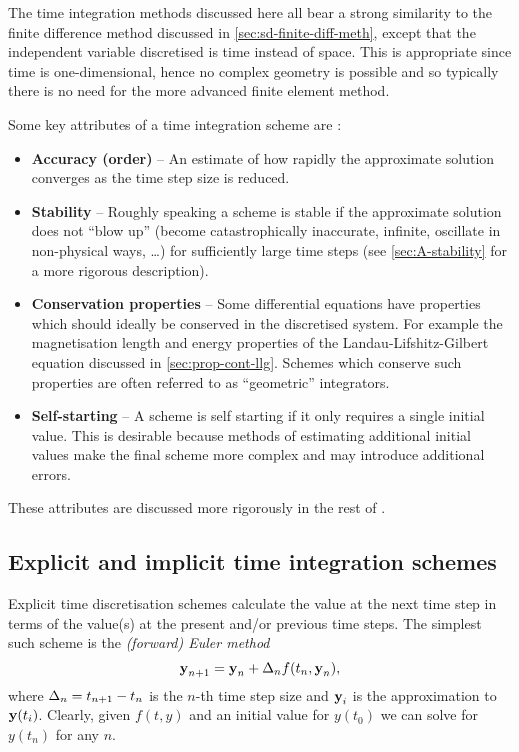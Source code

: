 The time integration methods discussed here all bear a strong similarity to the finite difference method discussed in \cref{sec:sd-finite-diff-meth}, except that the independent variable discretised is time instead of space.
This is appropriate since time is one-dimensional, hence no complex geometry is possible and so typically there is no need for the more advanced finite element method.

Some key attributes of a time integration scheme are \cite{Atkinson2009}:
\begin{itemize}
\item \textbf{Accuracy (order)} -- An estimate of how rapidly the approximate solution converges as the time step size is reduced.

\item \textbf{Stability} -- Roughly speaking a scheme is stable if the approximate solution does not ``blow up'' (\ie become catastrophically inaccurate, infinite, oscillate in non-physical ways, \ldots) for sufficiently large time steps (see \cref{sec:A-stability} for a more rigorous description).

\item \textbf{Conservation properties} -- Some differential equations have properties which should ideally be conserved in the discretised system.
For example the magnetisation length and energy properties of the Landau-Lifshitz-Gilbert equation discussed in \cref{sec:prop-cont-llg}.
Schemes which conserve such properties are often referred to as ``geometric'' integrators.

\item \textbf{Self-starting} -- A scheme is self starting if it only requires a single initial value.
This is desirable because methods of estimating additional initial values make the final scheme more complex and may introduce additional errors.
\end{itemize}

These attributes are discussed more rigorously in the rest of .

\subsection{Explicit and implicit time integration schemes}
\label{sec:explicit-vs-implicit-schemes}

Explicit time discretisation schemes calculate the value at the next time step in terms of the value(s) at the present and/or previous time steps.
The simplest such scheme is the \emph{(forward) Euler method}
\begin{equation}
  \label{eq:44}
  \boldsymbol{\mathrm{y}}_{n+1} = \boldsymbol{\mathrm{y}}_n + \Delta_{n} f(t_n, \boldsymbol{\mathrm{y}}_n),
\end{equation}
where $\Delta_{n} = t_{n+1} - t_n$ is the $n$-th time step size and $\boldsymbol{\mathrm{y}}_i$ is the approximation to $\boldsymbol{\mathrm{y}}(t_i)$.
Clearly, given $f(t,y)$ and an initial value for $y(t_0)$ we can solve for $y(t_n)$ for any $n$.


